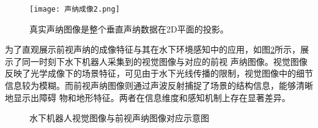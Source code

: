 \begin{figure}[ht]
	\centering
	\texttt{[image: 声纳成像2.png]}
	\caption{真实声纳图像是整个垂直声纳数据在2D平面的投影。}
	\label{fig:声纳成像2}
\end{figure}

为了直观展示前视声纳的成像特征与其在水下环境感知中的应用，如图\ref{fig:水下机器人视觉图像与前视声纳图像对应示意图}所示，展示了同一时刻下水下机器人采集到的视觉图像与对应的前视
声纳图像。视觉图像反映了光学成像下的场景特征，可见由于水下光线传播的限制，视觉图像中的细节信息较为模糊。而前视声纳图像则通过声波反射捕捉了场景的结构信息，能够清晰地显示出障碍
物和地形特征。两者在信息维度和感知机制上存在显著差异。

\begin{figure}[!ht]
	\centering
	\newsavebox{\standardbox}
  
	\begin{minipage}{\textwidth}
	  \centering
	  \hspace{0.5em}
	\end{minipage}
  
	\caption{水下机器人视觉图像与前视声纳图像对应示意图}
	\label{fig:水下机器人视觉图像与前视声纳图像对应示意图}
  \end{figure}

